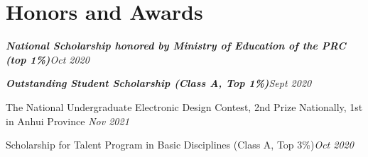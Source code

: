 \vspace{0.5pt}
\section{Honors and Awards}
\begin{description}[font=$\bullet$]
\item \textit{\textbf{National Scholarship honored by Ministry of Education of the PRC (top 1\%)}}\hfill\textit{Oct 2020}\vspace{-5pt}
\item \textbf{\textit{Outstanding Student Scholarship (Class A, Top 1\%)}}\hfill\textit{Sept 2020}\vspace{-5pt}
\item{ The National Undergraduate Electronic Design Contest, 2nd Prize Nationally, 1st in Anhui Province \hfill\textit{Nov 2021}}\vspace{-5pt}
\item{Scholarship for Talent Program in Basic Disciplines (Class A, Top 3\%)\hfill\textit{Oct 2020}}\vspace{-5pt}

\end{description}